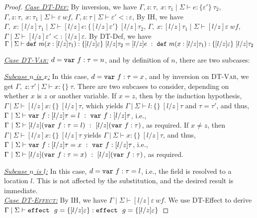 \begin{proof}
\noindent\underline{\textit{Case \textsc{DT-Def}:}}  By inversion, we have 
  $ \Gamma, z:\tau ,~x : \tau_1 \mid \Sigma \vdash e : \{ \varepsilon' \}~\tau_2$,
  $\Gamma,z:\tau ,~x : \tau_1 \mid \Sigma \vdash \varepsilon~\mathit{wf} $,
  $\Gamma, z:\tau \mid \Sigma \vdash \varepsilon' <: \varepsilon $,
  By IH, we have
\mbox{$ \Gamma ,~x : [l/z]\tau_1 \mid \Sigma \vdash [l/z]e : \{ [l/z]\varepsilon' \}~[l/z]\tau_2$},
  \mbox{$\Gamma, ~x : [l/z]\tau_1 \mid \Sigma \vdash [l/z]\varepsilon~\mathit{wf} $},
  \mbox{$\Gamma \mid \Sigma \vdash [l/z]\varepsilon' <: [l/z]\varepsilon $}.
  By DT-Def, we have
  \mbox{$\Gamma \mid \Sigma \vdash \mathtt{def}~ m(x : [l/z]\tau_1) : \{ [l/z]\varepsilon \}~[l/z]\tau_2 = [l/z]e~:~\mathtt{def}~ m(x : [l/z]\tau_1) : \{ [l/z]\varepsilon \}~[l/z]\tau_2$}

\noindent\underline{\textit{Case \textsc{DT-Var}:}} $d = \mathtt{var}~ f : \tau = n$, and by definition of $n$, there are two subcases:

\underline{\textit{Subcase $n$ is $x$:}} In this case, \mbox{$d = \mathtt{var}~ f : \tau = x$}, and by inversion on \textsc{DT-Var}, we get\linebreak
\mbox{$\Gamma,~z : \tau'~|~\Sigma \vdash x : \{ \}~\tau$}. There are two subcases to consider, depending on whether $x$ is $z$ or another variable. If $x = z$, then by the induction hypothesis, \mbox{$\Gamma~|~\Sigma \vdash [l/z]x : \{ \}~[l/z]\tau$}, which yields \mbox{$\Gamma~|~\Sigma \vdash l : \{ \}~[l/z]\tau$} and \mbox{$\tau = \tau'$}, and thus,
\mbox{$\Gamma~|~\Sigma \vdash \mathtt{var}~ f : [l/z]\tau = l~:~\mathtt{var}~ f : [l/z]\tau$}, i.e.,\linebreak
\mbox{$\Gamma~|~\Sigma \vdash [l/z](\mathtt{var}~ f : \tau = l)~:~[l/z](\mathtt{var}~ f : \tau)$}, as required. If \mbox{$x \not = z$}, then
\mbox{$\Gamma~|~\Sigma \vdash [l/z]x : \{ \}~[l/z]\tau$} yields \mbox{$\Gamma~|~\Sigma \vdash x : \{ \}~[l/z]\tau$}, and thus,
\mbox{$\Gamma~|~\Sigma \vdash \mathtt{var}~ f : [l/z]\tau = x~:~\mathtt{var}~ f : [l/z]\tau$}, i.e.,\linebreak
\mbox{$\Gamma~|~\Sigma \vdash [l/z](\mathtt{var}~ f : \tau = x)~:~[l/z](\mathtt{var}~ f : \tau)$}, as required.

\underline{\textit{Subcase $n$ is $l$:}} In this case, \mbox{$d = \mathtt{var}~ f : \tau = l$}, i.e., the field is resolved to a location $l$. This is not affected by the substitution, and the desired result is immediate.\\



\noindent\underline{\textit{Case \textsc{DT-Effect}:}}
By IH, we have
 $\Gamma \mid \Sigma \vdash [l/z]\varepsilon\ wf$.
 We use DT-Effect to derive
 \mbox{$\Gamma \mid \Sigma \vdash \mathtt{effect}~ \ g = \{[l/z]\varepsilon\} :\mathtt{effect}~\ g = \{[l/z]\varepsilon\}$}



\end{proof}
